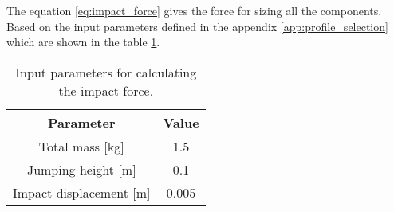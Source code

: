 The equation \ref{eq:impact_force} gives the force for sizing all the components.
Based on the input parameters defined in the appendix \ref{app:profile_selection} which are shown in the table \ref{tab:input_parameter_impact_force}.
\begin{table}
\begin{center}
\begin{tabular}{c | c}
  Parameter & Value \\
  \hline
  Total mass [kg] & 1.5 \\
  Jumping height [m] & 0.1 \\
  Impact displacement [m] & 0.005
\end{tabular}
\caption{Input parameters for calculating the impact force.}
\label{tab:input_parameter_impact_force}
\end{center}
\end{table}
